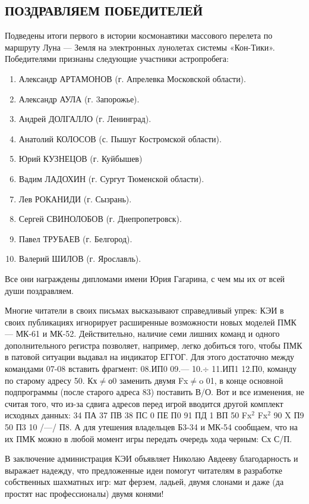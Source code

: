 \documentclass[11pt,a4paper,oneside]{article}
\begin{document}
\subsection{ПОЗДРАВЛЯЕМ ПОБЕДИТЕЛЕЙ}

Подведены итоги первого в истории космонавтики массового перелета по маршруту Луна — Земля на электронных лунолетах системы «Кон-Тики». Победителями признаны следующие участники астропробега:
\begin{enumerate}
\item Александр АРТАМОНОВ (г. Апрелевка Московской области).
\item Александр АУЛА (г. 3апорожье).
\item Андрей ДОЛГАЛЛО (г. Ленинград).
\item Анатолий КОЛОСОВ (с. Пышуг Костромской области).
\item Юрий КУЗНЕЦОВ (г. Куйбышев)
\item Вадим ЛАДОХИН (г. Сургут Тюменской области).
\item Лев РОКАНИДИ (г. Сызрань).
\item Сергей СВИНОЛОБОВ (г. Днепропетровск).
\item Павел ТРУБАЕВ (г. Белгород).
\item Валерий ШИЛОВ (г. Ярославль).
\end{enumerate}

Все они награждены дипломами имени Юрия Гагарина, с чем мы их от всей души поздравляем.

Многие читатели в своих письмах высказывают справедливый упрек: КЭИ в своих публикациях игнорирует расширенные возможности новых моделей ПМК — МК-61 и МК-52. Действительно, наличие семи лишних команд и одного дополнительного регистра позволяет, например, легко добиться того, чтобы ПМК в патовой ситуации выдавал на индикатор ЕГГОГ. Для этого достаточно между командами 07-08 вставить фрагмент: 08.ИП0 09.— 10.$\div$ 11.ИП1 12.П0, команду по старому адресу 50. Кх$\neq$о0 заменить двумя Fx$\neq$o 01, в конце основной подпрограммы (после старого адреса 83) поставить В/О. Вот и все изменения, не считая того, что из-за сдвига адресов перед игрой вводится другой комплект исходных данных: 34 ПА 37 ПВ 38 ПС 0 ПЕ П0 91 ПД 1 ВП 50 Fx$^{2}$ Fx$^{2}$ 90 X П9 50 П3 10 /—/ П8. А для утешения владельцев Б3-34 и МК-54 сообщаем, что на их ПМК можно в любой момент игры передать очередь хода черным: Сх С/П.

В заключение администрация КЭИ объявляет Николаю Авдееву благодарность и выражает надежду, что предложенные идеи помогут читателям в разработке собственных шахматных игр: мат ферзем, ладьей, двумя слонами и даже (да простят нас профессионалы) двумя конями!
\end{document}

